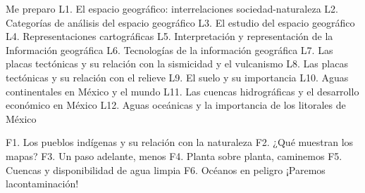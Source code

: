 Me preparo
L1.   El espacio geográfico: interrelaciones sociedad-naturaleza
L2.   Categorías de análisis del espacio geográfico
L3.   El estudio del espacio geográfico
L4.   Representaciones cartográficas
L5.   Interpretación y representación de la Información geográfica
L6.   Tecnologías de la información geográfica
L7.   Las placas tectónicas y su relación con la sismicidad y el vulcanismo
L8.   Las placas tectónicas y su relación con el relieve
L9.   El suelo y su importancia
L10.  Aguas continentales en México y el mundo
L11.  Las cuencas hidrográficas y el desarrollo económico en México
L12.  Aguas oceánicas y la importancia de los litorales de México


F1.  Los pueblos indígenas y su relación con la naturaleza
F2.  ¿Qué muestran los mapas?
F3.  Un paso adelante, menos
F4.  Planta sobre planta, caminemos
F5.  Cuencas y disponibilidad de agua limpia
F6.  Océanos en peligro ¡Paremos lacontaminación!

     